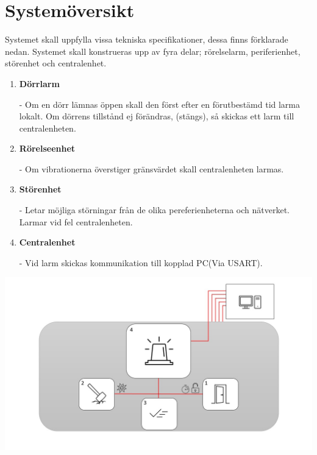 \section{Systemöversikt}

Systemet skall uppfylla vissa tekniska specifikationer, dessa finns förklarade nedan. Systemet skall konstrueras upp av fyra delar; rörelselarm, periferienhet, störenhet och centralenhet.

\begin{enumerate}
\item \textbf{Dörrlarm}

- Om en dörr lämnas öppen skall den först efter en förutbestämd tid larma lokalt. Om dörrens tillstånd ej förändras, (stängs), så skickas ett larm till centralenheten.

\item \textbf{Rörelseenhet}

- Om vibrationerna överstiger gränsvärdet skall centralenheten larmas.

\item \textbf{Störenhet}

- Letar möjliga störningar från de olika pereferienheterna och nätverket. Larmar vid fel centralenheten.

\item \textbf{Centralenhet}

- Vid larm skickas kommunikation till kopplad PC(Via USART). 
\end{enumerate}

\includegraphics[width=\textwidth]{system3.jpg}
